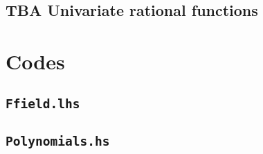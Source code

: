 \documentclass[11pt]{book}
\begin{document}
%
%
%

\section{TBA Univariate rational functions}



















\chapter{Codes}
\section{\texttt{Ffield.lhs}}


\section{\texttt{Polynomials.hs}}

\end{document}
